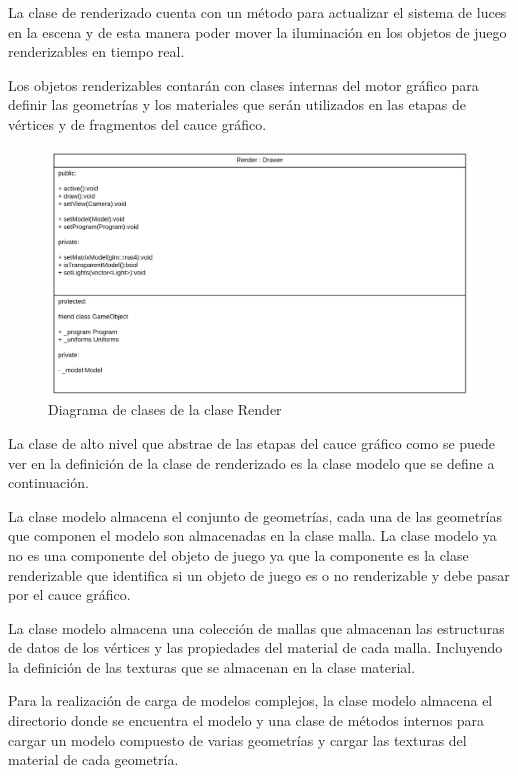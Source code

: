 \documentclass[a4paper, 17pt]{book}
\begin{document}
La clase de renderizado cuenta con un método para actualizar el sistema de luces en la escena y de esta manera poder mover
la iluminación en los objetos de juego renderizables en tiempo real.

Los objetos renderizables contarán con clases internas del motor gráfico para definir las geometrías y los materiales que
serán utilizados en las etapas de vértices y de fragmentos del cauce gráfico.

\begin{figure}[hbt!]
    \centering
    \includegraphics[scale=0.25, keepaspectratio]{img/Render.png}
    \caption{Diagrama de clases de la clase Render}
    \label{figura:Render}
\end{figure}

La clase de alto nivel que abstrae de las etapas del cauce gráfico como se puede ver en la definición de la clase de renderizado es
la clase modelo que se define a continuación.

La clase modelo almacena el conjunto de geometrías, cada una de las geometrías que componen el modelo son almacenadas en la clase
malla. La clase modelo ya no es una componente del objeto de juego ya que la componente es la clase renderizable que identifica
si un objeto de juego es o no renderizable y debe pasar por el cauce gráfico. 

La clase modelo almacena una colección de mallas que almacenan las estructuras de datos de los vértices y las propiedades del
material de cada malla. Incluyendo la definición de las texturas que se almacenan en la clase material.

Para la realización de carga de modelos complejos, la clase modelo almacena el directorio donde se encuentra el modelo y una clase
de métodos internos para cargar un modelo compuesto de varias geometrías y cargar las texturas del material de cada geometría.
\end{document}
